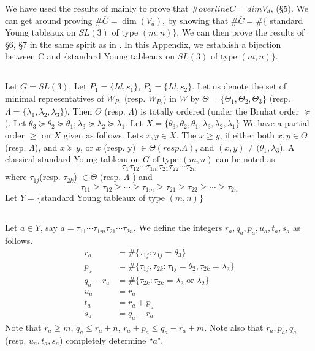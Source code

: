 We have used the results of \cite{art9-keyL2} mainly to prove that $\#overline{C}= dimV_{d}$, (\S 5). We can get
around proving $\#\overline{C}= \dim(V_{d})$, by showing that $\#\overline{C}= \#\{$ standard Young tableaux on $SL(3)$ of type $(m,n)\}$. We can then prove the results of \S 6, \S 7 in the same spirit as in \cite{art9-keyL-S}. In this Appendix, we establish a bijection between C and $\{$standard Young tableaux on $SL(3)$ of type $(m,n)\}$. 

\subsection{}\label{art9-subsec-8.1}
Let $G = SL(3)$. Let $P_{1}= \{Id, s_{1}\}$, $P_{2} = \{Id, s_{2}\}$. Let us denote the set of minimal representatives of $W_{P_{1}}$ (resp. $W_{P_{2}}$) in $W$ by $\Theta = \{ \Theta_{1}, \Theta_{2},\Theta_{3}\}$ (resp. $\Lambda=\{ \lambda_{1},\lambda_{2}, \lambda_{3}\}$). Then $\Theta$ (resp. $\Lambda$) is totally ordered (under the Bruhat order $\succeq$ ). Let $\theta_{3} \succeq \theta_{2} \succeq \theta_{1}; \lambda_{3} \succeq \lambda_{2} \succeq \lambda_{1}$. Let $X= \{ \theta_{3}, \theta_{2}, \theta_{1}, \lambda_{3}, \lambda_{2}, \lambda_{1}\}$ We have a partial order $\geq$ on $X$ given as follows. Lets $x,y \in X$. The $x \geq y$, if either both $ x,y \in \Theta$ (resp. $\Lambda$), and $x \succeq y$, or $x$ (resp. y) $\in \Theta (resp. \Lambda)$, and $(x,y) \neq (\theta_{1},\lambda_{3}$). A classical standard Young tableau on $G$ of type $(m,n)$ can  be noted as
 $$
\tau_{1}\tau_{12}\cdots \tau_{1m}\tau_{21}\tau_{22}\cdots \tau_{2n}
 $$
where $\tau_{1j}$(resp. $\tau_{2k}$) $\in \Theta$ (resp. $\Lambda$ ) and
$$
\tau_{11} \geq \tau_{12} \geq \cdots \geq \tau_{1m} \geq \tau_{21} \geq \tau_{22} \geq \cdots \geq \tau_{2n}
$$
Let $Y =\{$standard Young tableaux of type $(m,n)\}$

\subsection{}\label{art9-subsec-8.2}
Let $a \in Y$, say $a = \tau_{11} \cdots \tau_{1m}\tau_{21} \cdots \tau_{2n}$. We define the integers $r_{a}, q_{a}, p_{a}, u_{a}, t_{a}, s_{a}$ as follows.
\begin{align*}
r_{a} &= \#\{\tau_{1j}: \tau_{1j} = \theta_{3} \}\\
p_{a} &= \# \{\tau_{1j}, \tau_{2k} : \tau_{1j}= \theta_{2}, \tau_{2k} = \lambda_{3} \}\\
q_{a}-r_{a} &= \# \{ \tau_{2k} : \tau_{2k} = \lambda_{3} \; \text{or} \; \lambda_{2} \}\\
u_{a} &= r_{a}\\
t_{a} &= r_{a}+p_{a}\\
s_{a} &= q_{a}-r_{a}
\end{align*}
Note that $ r_{a} \geq m$, $ q_{a}\leq r_{a} + n$, $r_{a} + p_{a} \leq q_{a}-r_{a} +m$. Note also that $r_{a}, p_{a}, q_{a}$ (resp. $u_{a}, t_{a}, s_{a}$) completely determine ``$a$". 

